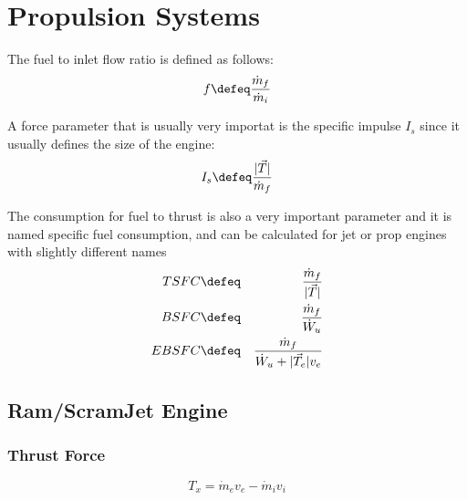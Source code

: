 \chapter{Propulsion Systems}
    
    The fuel to inlet flow ratio is defined as follows:
    \begin{equation}
        f \defeq \frac{\dot{m}_f}{\dot{m}_i}
    \end{equation}
    
 
    A force parameter that is usually very importat is the specific impulse $I_s$ since it usually defines the size of the engine:
    \begin{equation}
        I_s \defeq \frac{|\vec{T}|}{\dot{m}_f} 
    \end{equation}
    
    The consumption for fuel to thrust is also a very important parameter and it is named specific fuel consumption, and can be calculated for jet or prop engines with slightly different names 
    \begin{align}
       TSFC  &\defeq& \frac{\dot{m}_f}{|\vec{T}|} \\
       BSFC  &\defeq& \frac{\dot{m}_f}{\dot{W}_u} \\
       EBSFC &\defeq& \frac{\dot{m}_f}{\dot{W}_u + |\vec{T}_e|v_e} \\
    \end{align}
 


\newpage
\section{Ram/ScramJet Engine}
    \subsection{Thrust Force}
    \begin{equation}
        T_x = \dot{m}_e v_e - \dot{m}_i v_i
    \end{equation}
 
